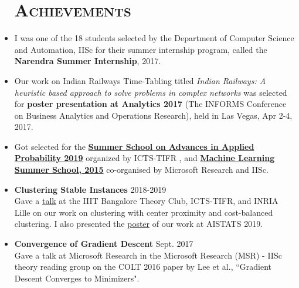 \documentclass[line,margin]{res2}
\begin{document}
\begin{resume}
\begin{itemize}
\section{\textsc{Achievements}}
  \item I was one of the 18 students selected by the Department of Computer Science and Automation, IISc for their summer internship program, called the {\bf Narendra Summer Internship}, 2017.
  \item Our work on Indian Railways Time-Tabling titled \textit{Indian Railways: A heuristic based approach to solve problems in complex networks} was selected for {\bf poster presentation at Analytics 2017} (The INFORMS Conference on Business Analytics and Operations Research), held in Las Vegas, Apr 2-4, 2017.
  \item Got selected for the \href{https://www.icts.res.in/program/paap2019}{\bf Summer School on Advances in Applied Probability 2019} organized by ICTS-TIFR  , and \href{https://www.dropbox.com/s/sthrucrghdsa87t/MLSS_Certificate.pdf?dl=0}{\bf Machine Learning Summer School, 2015} co-organised by Microsoft Research and IISc.
\end{itemize}

\begin{itemize}
\section{\textsc{Presentations}}
\item {\bf Clustering Stable Instances} \hfill 2018-2019  \\
 Gave a \href{https://iiitbtheoryclub.github.io/talks/2018/12/01/clutering-perturbation.html}{talk} at the IIIT Bangalore Theory Club, ICTS-TIFR, and INRIA Lille on our work on clustering with center proximity and cost-balanced clustering. I also presented the \href{https://www.dropbox.com/s/rvypyyg0wyawz33/poster.pdf?dl=0}{poster} of our work at AISTATS 2019.
 \item {\bf Convergence of Gradient Descent} \hfill Sept. 2017\\
  Gave a talk at Microsoft Research in the Microsoft Research (MSR) - IISc theory reading group on the COLT 2016 paper by Lee et al., ``Gradient Descent Converges to Minimizers".
\end{itemize}

\begin{itemize}

\end{itemize}
\end{resume}
\end{document}

